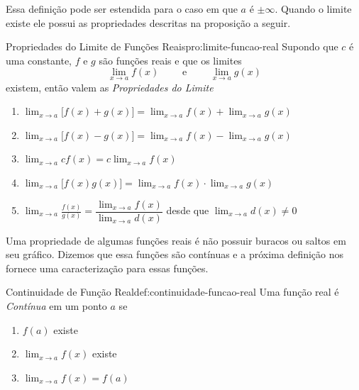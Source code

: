 Essa definição pode ser estendida para o caso em que $a$ é $\pm\infty$.
Quando o limite existe ele possui as propriedades descritas na proposição a seguir.

\begin{proposicao}{Propriedades do Limite de Funções Reais}{pro:limite-funcao-real}
  Supondo que $c$ é uma constante, $f$ e $g$ são funções reais e que os limites
  \[
    \lim_{x\to a} f(x) \qquad\text{ e }\qquad \lim_{x\to a} g(x)
  \]
  existem, então valem as \emph{Propriedades do Limite}
  \begin{enumerate}
    \item \( \lim_{x\to a} \Big[ f(x) + g(x) \Big] = \lim_{x\to a} f(x) + \lim_{x\to a} g(x) \)
    \item \( \lim_{x\to a} \Big[ f(x) - g(x) \Big] = \lim_{x\to a} f(x) - \lim_{x\to a} g(x) \)
    \item \( \lim_{x\to a} cf(x) = c \lim_{x\to a} f(x) \)
    \item \( \lim_{x\to a} \Big[ f(x)g(x) \Big] = \lim_{x\to a} f(x) \cdot \lim_{x\to a} g(x) \)
    \item \( \lim_{x\to a} \frac{f(x)}{g(x)} = \dfrac{\displaystyle\lim_{x\to a} f(x)}
                                                     {\displaystyle\lim_{x\to a} d(x)} \)
          \qquad desde que \(\lim_{x\to a} d(x) \neq 0\)
  \end{enumerate}
\end{proposicao}

Uma propriedade de algumas funções reais é não possuir buracos ou saltos em seu
gráfico. Dizemos que essa funções são contínuas e a próxima definição nos fornece
uma caracterização para essas funções.

\begin{definicao}{Continuidade de Função Real}{def:continuidade-funcao-real}
  Uma função real é \emph{Contínua} em um ponto $a$ se
  \begin{enumerate}
    \item \( f(a) \) existe
    \item \( \lim_{x\to a} f(x) \) existe
    \item \( \lim_{x\to a} f(x) = f(a) \)
  \end{enumerate}
\end{definicao}

